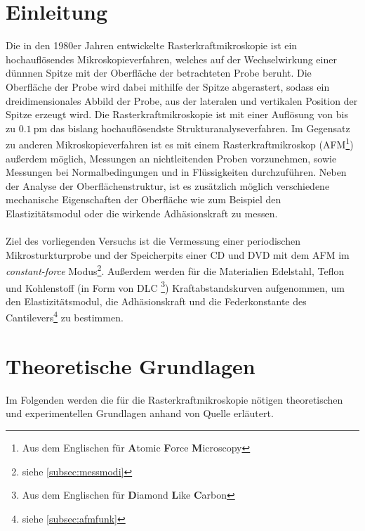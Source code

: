 \setcounter{page}{1}
\section*{Einleitung}
Die in den 1980er Jahren entwickelte Rasterkraftmikroskopie ist ein hochauflösendes Mikroskopieverfahren, welches auf der Wechselwirkung einer dünnnen Spitze mit der Oberfläche der betrachteten Probe beruht. Die Oberfläche der Probe wird dabei mithilfe der Spitze abgerastert, sodass ein dreidimensionales Abbild der Probe, aus der lateralen und vertikalen Position der Spitze erzeugt wird. Die Rasterkraftmikroskopie ist mit einer Auflösung von bis zu $\SI{0,1}{\pico\meter}$ das bislang hochauflösendste Strukturanalyseverfahren. Im Gegensatz zu anderen Mikroskopieverfahren ist es mit einem Rasterkraftmikroskop (AFM\footnote{Aus dem Englischen für \textbf{A}tomic \textbf{F}orce \textbf{M}icroscopy}) außerdem möglich, Messungen an nichtleitenden Proben vorzunehmen, sowie Messungen bei Normalbedingungen und in Flüssigkeiten durchzuführen. Neben der Analyse der Oberflächenstruktur, ist es zusätzlich möglich verschiedene mechanische Eigenschaften der Oberfläche wie zum Beispiel den Elastizitätsmodul oder die wirkende Adhäsionskraft zu messen. \\
\\
Ziel des vorliegenden Versuchs ist die Vermessung einer periodischen Mikrosturkturprobe und der Speicherpits einer CD und DVD mit dem AFM im \textit{constant-force} Modus\footnote{siehe \autoref{subsec:messmodi}}. Außerdem werden für die Materialien Edelstahl, Teflon und Kohlenstoff (in Form von DLC \footnote{Aus dem Englischen für \textbf{D}iamond \textbf{L}ike \textbf{C}arbon}) Kraftabstandskurven aufgenommen, um den Elastizitätsmodul, die Adhäsionskraft und die Federkonstante des Cantilevers\footnote{siehe \autoref{subsec:afmfunk}} zu bestimmen.
\section{Theoretische Grundlagen}
Im Folgenden werden die für die Rasterkraftmikroskopie nötigen theoretischen und experimentellen Grundlagen anhand von Quelle \cite{Voigt} erläutert.
